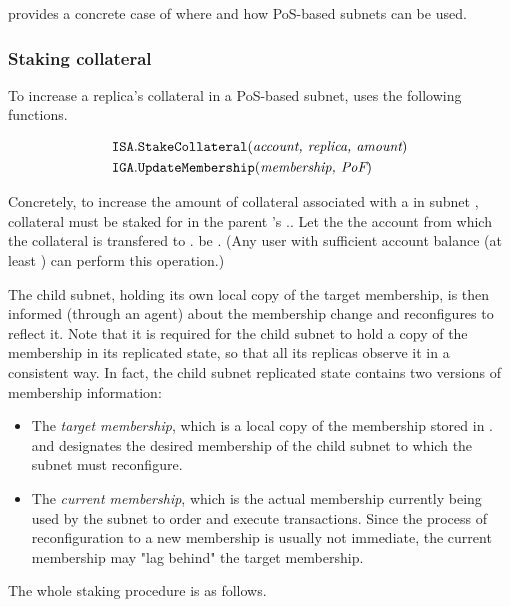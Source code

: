  provides a concrete case of where and how PoS-based subnets can be used.

\subsubsection{Staking collateral}
\label{sec:staking-collateral}

To increase a replica's collateral in a PoS-based subnet, \ipc uses the following functions.

\begin{align*}
    \texttt{ISA}.&\texttt{StakeCollateral}(\textit{account, replica, amount})\\
    \texttt{IGA}.&\texttt{UpdateMembership}(\textit{membership, \textit{PoF}})
\end{align*}

Concretely, to increase the amount of collateral associated with a  in subnet ,
collateral must be staked for  in the parent 's \saFull {}..
Let the the account from which the collateral is transfered to . be .
(Any user with sufficient account balance (at least ) can perform this operation.)

The child subnet, holding its own local copy of the target membership, is then informed (through an \ipc agent) about the membership change and reconfigures to reflect it.
Note that it is required for the child subnet to hold a copy of the membership in its replicated state, so that all its replicas observe it in a consistent way.
In fact, the child subnet replicated state contains two versions of membership information:
\begin{itemize}
    \item The \emph{target membership}, which is a local copy of the membership stored in . and designates the desired membership of the child subnet
    to which the subnet must reconfigure.
    \item The \emph{current membership}, which is the actual membership currently being used by the subnet to order and execute transactions.
    Since the process of reconfiguration to a new membership is usually not immediate, the current membership may "lag behind" the target membership.
\end{itemize}
The whole staking procedure is as follows.

